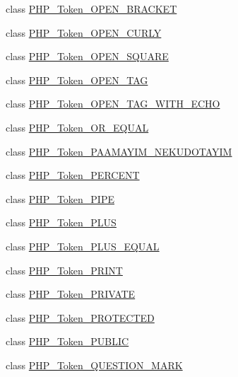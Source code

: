 \begin{DoxyCompactItemize}
\item 
class \mbox{\hyperlink{class_p_h_p___token___o_p_e_n___b_r_a_c_k_e_t}{P\+H\+P\+\_\+\+Token\+\_\+\+O\+P\+E\+N\+\_\+\+B\+R\+A\+C\+K\+ET}}
\item 
class \mbox{\hyperlink{class_p_h_p___token___o_p_e_n___c_u_r_l_y}{P\+H\+P\+\_\+\+Token\+\_\+\+O\+P\+E\+N\+\_\+\+C\+U\+R\+LY}}
\item 
class \mbox{\hyperlink{class_p_h_p___token___o_p_e_n___s_q_u_a_r_e}{P\+H\+P\+\_\+\+Token\+\_\+\+O\+P\+E\+N\+\_\+\+S\+Q\+U\+A\+RE}}
\item 
class \mbox{\hyperlink{class_p_h_p___token___o_p_e_n___t_a_g}{P\+H\+P\+\_\+\+Token\+\_\+\+O\+P\+E\+N\+\_\+\+T\+AG}}
\item 
class \mbox{\hyperlink{class_p_h_p___token___o_p_e_n___t_a_g___w_i_t_h___e_c_h_o}{P\+H\+P\+\_\+\+Token\+\_\+\+O\+P\+E\+N\+\_\+\+T\+A\+G\+\_\+\+W\+I\+T\+H\+\_\+\+E\+C\+HO}}
\item 
class \mbox{\hyperlink{class_p_h_p___token___o_r___e_q_u_a_l}{P\+H\+P\+\_\+\+Token\+\_\+\+O\+R\+\_\+\+E\+Q\+U\+AL}}
\item 
class \mbox{\hyperlink{class_p_h_p___token___p_a_a_m_a_y_i_m___n_e_k_u_d_o_t_a_y_i_m}{P\+H\+P\+\_\+\+Token\+\_\+\+P\+A\+A\+M\+A\+Y\+I\+M\+\_\+\+N\+E\+K\+U\+D\+O\+T\+A\+Y\+IM}}
\item 
class \mbox{\hyperlink{class_p_h_p___token___p_e_r_c_e_n_t}{P\+H\+P\+\_\+\+Token\+\_\+\+P\+E\+R\+C\+E\+NT}}
\item 
class \mbox{\hyperlink{class_p_h_p___token___p_i_p_e}{P\+H\+P\+\_\+\+Token\+\_\+\+P\+I\+PE}}
\item 
class \mbox{\hyperlink{class_p_h_p___token___p_l_u_s}{P\+H\+P\+\_\+\+Token\+\_\+\+P\+L\+US}}
\item 
class \mbox{\hyperlink{class_p_h_p___token___p_l_u_s___e_q_u_a_l}{P\+H\+P\+\_\+\+Token\+\_\+\+P\+L\+U\+S\+\_\+\+E\+Q\+U\+AL}}
\item 
class \mbox{\hyperlink{class_p_h_p___token___p_r_i_n_t}{P\+H\+P\+\_\+\+Token\+\_\+\+P\+R\+I\+NT}}
\item 
class \mbox{\hyperlink{class_p_h_p___token___p_r_i_v_a_t_e}{P\+H\+P\+\_\+\+Token\+\_\+\+P\+R\+I\+V\+A\+TE}}
\item 
class \mbox{\hyperlink{class_p_h_p___token___p_r_o_t_e_c_t_e_d}{P\+H\+P\+\_\+\+Token\+\_\+\+P\+R\+O\+T\+E\+C\+T\+ED}}
\item 
class \mbox{\hyperlink{class_p_h_p___token___p_u_b_l_i_c}{P\+H\+P\+\_\+\+Token\+\_\+\+P\+U\+B\+L\+IC}}
\item 
class \mbox{\hyperlink{class_p_h_p___token___q_u_e_s_t_i_o_n___m_a_r_k}{P\+H\+P\+\_\+\+Token\+\_\+\+Q\+U\+E\+S\+T\+I\+O\+N\+\_\+\+M\+A\+RK}}

\end{DoxyCompactItemize}
